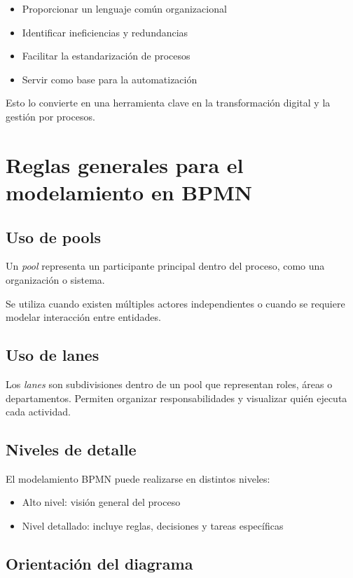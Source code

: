 \documentclass[12pt,a4paper]{article}
\begin{document}
\begin{itemize}
    \item Proporcionar un lenguaje común organizacional
    \item Identificar ineficiencias y redundancias
    \item Facilitar la estandarización de procesos
    \item Servir como base para la automatización
\end{itemize}

Esto lo convierte en una herramienta clave en la transformación digital y la gestión por procesos.

\section{Reglas generales para el modelamiento en BPMN}

\subsection{Uso de pools}

Un \textit{pool} representa un participante principal dentro del proceso, como una organización o sistema.

Se utiliza cuando existen múltiples actores independientes o cuando se requiere modelar interacción entre entidades.

\subsection{Uso de lanes}

Los \textit{lanes} son subdivisiones dentro de un pool que representan roles, áreas o departamentos. Permiten organizar responsabilidades y visualizar quién ejecuta cada actividad.

\subsection{Niveles de detalle}

El modelamiento BPMN puede realizarse en distintos niveles:

\begin{itemize}
    \item Alto nivel: visión general del proceso
    \item Nivel detallado: incluye reglas, decisiones y tareas específicas
\end{itemize}

\subsection{Orientación del diagrama}
\end{document}
